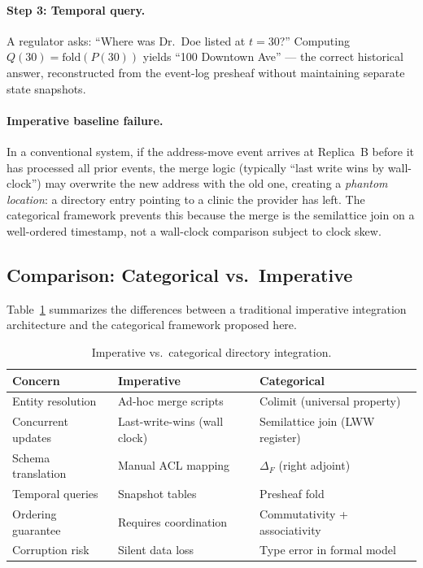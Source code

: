 \documentclass[11pt,a4paper]{article}
\begin{document}
\paragraph{Step 3: Temporal query.}
A regulator asks: ``Where was Dr.~Doe listed at $t\!=\!30$?''  Computing
$Q(30)=\mathrm{fold}(P(30))$ yields ``100 Downtown
Ave'' — the correct historical answer, reconstructed from the
event-log presheaf without maintaining separate state snapshots.

\paragraph{Imperative baseline failure.}
In a conventional system, if the address-move event arrives at
Replica~B before it has processed all prior events, the merge logic
(typically ``last write wins by wall-clock'') may overwrite the new
address with the old one, creating a \emph{phantom location}: a
directory entry pointing to a clinic the provider has left. The
categorical framework prevents this because the merge is the
semilattice join on a well-ordered timestamp, not a wall-clock
comparison subject to clock skew.

\subsection{Comparison: Categorical vs.\ Imperative}
\label{sec:comparison}

Table~\ref{tab:comparison} summarizes the differences between a
traditional imperative integration architecture and the categorical
framework proposed here.

\begin{table}[ht]
\centering
\caption{Imperative vs.\ categorical directory integration.}
\label{tab:comparison}
\begin{tabular}{@{}lll@{}}
\toprule
\textbf{Concern} & \textbf{Imperative} & \textbf{Categorical} \\
\midrule
Entity resolution & Ad-hoc merge scripts & Colimit (universal property) \\
Concurrent updates & Last-write-wins (wall clock) & Semilattice join (LWW register) \\
Schema translation & Manual ACL mapping & $\Delta_F$ (right adjoint) \\
Temporal queries & Snapshot tables & Presheaf fold \\
Ordering guarantee & Requires coordination & Commutativity + associativity \\
Corruption risk & Silent data loss & Type error in formal model \\
\bottomrule
\end{tabular}
\end{table}
\end{document}
